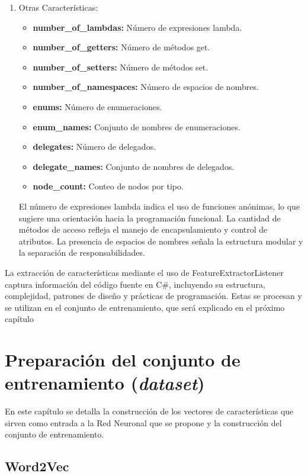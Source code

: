 \begin{enumerate}
    \item Otras Características:
    \begin{itemize}
        \item {\bf number\_of\_lambdas:} Número de expresiones lambda.
        \item {\bf number\_of\_getters:} Número de métodos get.
        \item {\bf number\_of\_setters:} Número de métodos set.
        \item {\bf number\_of\_namespaces:} Número de espacios de nombres.
        \item {\bf enums:} Número de enumeraciones.
        \item {\bf enum\_names:} Conjunto de nombres de enumeraciones.
        \item {\bf delegates:} Número de delegados.
        \item {\bf delegate\_names:} Conjunto de nombres de delegados.
        \item {\bf node\_count:} Conteo de nodos por tipo.
    \end{itemize}
    
  El número de expresiones lambda indica el uso de funciones anónimas, lo que sugiere una orientación hacia la programación funcional. La cantidad de métodos de acceso refleja el manejo de encapsulamiento y control de atributos. La presencia de espacios de nombres señala la estructura modular y la separación de responsabilidades. 
 
\end{enumerate}
    
La extracción de características mediante el uso de FeatureExtractorListener captura información del código fuente en C\#, incluyendo su estructura, complejidad, patrones de diseño y prácticas de programación. Estas se procesan y se utilizan en el conjunto de entrenamiento, que será explicado en el próximo capítulo

\chapter{Preparación del conjunto de entrenamiento (\textit{dataset})}\label{chapter:proposal}
En este capítulo se detalla la construcción de los vectores de características que sirven como entrada a la Red Neuronal que se propone y la construcción del conjunto de entrenamiento.

\section{Word2Vec}

